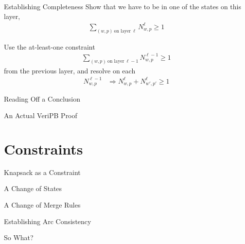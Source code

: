 \documentclass[aspectratio=169,compress,10pt]{beamer}
\begin{document}
\begin{frame}{Establishing Completeness}
    Show that we have to be in one of the states on this layer,
    \begin{align*}
        \sum_{(w,p)~\text{on layer}~\ell} N^\ell_{w,p} \ge 1
    \end{align*}

    Use the at-least-one constraint
    \begin{align*}
        \sum_{(w,p)~\text{on layer}~\ell - 1} N^{\ell-1}_{w,p} \ge 1
    \end{align*}
    from the previous layer, and resolve on each \begin{align*}
            N^{\ell-1}_{w,p} &\Rightarrow N^\ell_{w,p} + N^\ell_{w',p'} \ge 1
    \end{align*}
\end{frame}

\begin{frame}{Reading Off a Conclusion}
\end{frame}

\begin{frame}{An Actual VeriPB Proof}
\end{frame}

\section{Constraints}

\begin{frame}{Knapsack as a Constraint}
\end{frame}

\begin{frame}{A Change of States}
\end{frame}

\begin{frame}{A Change of Merge Rules}
\end{frame}

\begin{frame}{Establishing Arc Consistency}
\end{frame}

\begin{frame}{So What?}
\end{frame}
\end{document}
